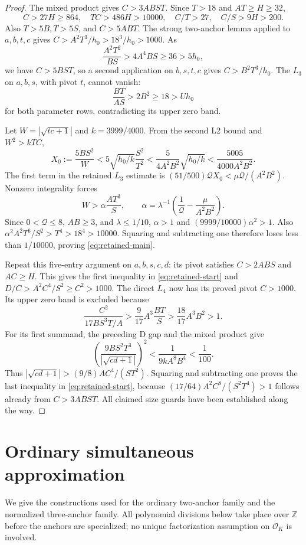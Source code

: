 \documentclass[12pt]{article}
\numberwithin{equation}{section}
\begin{document}
\begin{proof}
The mixed product gives \(C>3ABST\). Since \(T>18\) and \(AT\ge H\ge32\),
\[
 C>27H\ge864,\quad TC>486H>10000,\quad
 C/T>27,\quad C/S>9H>200.
\]
Also \(T>5B,T>5S\), and \(C>5ABT\). The strong two-anchor lemma
applied to \(a,b,t,c\) gives \(C>A^2T^3/h_0>18^3/h_0>1000\).
As
\[
 \frac{A^2T^2}{BS}>4A^4BS\ge36>5h_0,
\]
we have \(C>5BST\), so a second application on \(b,s,t,c\) gives
\(C>B^2T^3/h_0\).
The \(L_3\) on \(a,b,s\), with pivot \(t\), cannot vanish:
\[
 \frac{BT}{AS}>2B^2\ge18>Uh_0
\]
for both parameter rows, contradicting its upper zero band.

Let \(W=|\sqrt{tc+1}|\) and \(k=3999/4000\). From the second L2
bound and \(W^2>kTC\),
\[
 X_0:=\frac{5BS^2}{W}
 <5\sqrt{h_0/k}\frac{S^2}{T^2}
 <\frac5{4A^2B^2}\sqrt{h_0/k}
 <\frac{5005}{4000A^2B^2}.
\]
The first term in the retained \(L_3\) estimate is
\((51/500)\mathcal QX_0<\mu\mathcal Q/(A^2B^2)\).
Nonzero integrality forces
\[
 W>\alpha\frac{AT^3}{S},\qquad
 \alpha=\lambda^{-1}\left(\frac1{\mathcal Q}
                              -\frac{\mu}{A^2B^2}\right).
\]
Since \(0<\mathcal Q\le8\), \(AB\ge3\), and \(\lambda\le1/10\),
\(\alpha>1\) and \((9999/10000)\alpha^2>1\).
Also \(\alpha^2A^2T^6/S^2>T^4>18^4>10000\).
Squaring and subtracting one therefore loses less than \(1/10000\),
proving \eqref{eq:retained-main}.

Repeat this five-entry argument on \(a,b,s,c,d\): its pivot satisfies
\(C>2ABS\) and \(AC\ge H\). This gives the first inequality in
\eqref{eq:retained-start} and \(D/C>A^2C^4/S^2\ge C^2>1000\).
The direct \(L_4\) now has its proved pivot \(C>1000\).
Its upper zero band is excluded because
\[
 \frac{C^2}{17BS^3T/A}>
 \frac9{17}A^3\frac{BT}{S}>
 \frac{18}{17}A^3B^2>1.
\]
For its first summand, the preceding D gap and the mixed product give
\[
 \left(\frac{9BS^2T^3}{|\sqrt{cd+1}|}\right)^2
 <\frac1{9kA^8B^4}<\frac1{100}.
\]
Thus \(|\sqrt{cd+1}|>(9/8)AC^4/(ST^2)\). Squaring and subtracting
one proves the last inequality in \eqref{eq:retained-start}, because
\((17/64)A^2C^8/(S^2T^4)>1\) follows already from \(C>3ABST\).
All claimed size guards have been established along the way.
\end{proof}

\section{Ordinary simultaneous approximation}

We give the constructions used for the ordinary two-anchor family and
the normalized three-anchor family.  All polynomial divisions below take
place over $\mathbb Z$ before the anchors are specialized; no unique
factorization assumption on $\mathcal O_K$ is involved.
\end{document}
